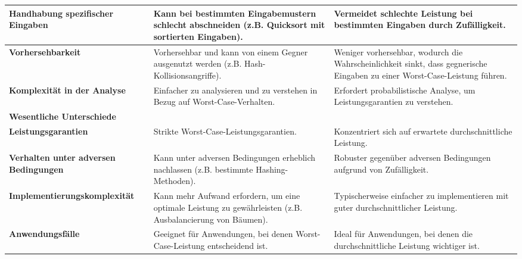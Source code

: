 \documentclass[
../../AuD-Zusammenfassung.tex,
]
{subfiles}
\begin{document}
\begin{longtable}{| p{4cm} | p{6cm} | p{6cm} |}
    \hline
    \textbf{Handhabung spezifischer Eingaben} & Kann bei bestimmten Eingabemustern schlecht abschneiden (z.B. Quicksort mit sortierten Eingaben). & Vermeidet schlechte Leistung bei bestimmten Eingaben durch Zufälligkeit. \\
    \hline
    \textbf{Vorhersehbarkeit} & Vorhersehbar und kann von einem Gegner ausgenutzt werden (z.B. Hash-Kollisionsangriffe). & Weniger vorhersehbar, wodurch die Wahrscheinlichkeit sinkt, dass gegnerische Eingaben zu einer Worst-Case-Leistung führen. \\
    \hline
    \textbf{Komplexität in der Analyse} & Einfacher zu analysieren und zu verstehen in Bezug auf Worst-Case-Verhalten. & Erfordert probabilistische Analyse, um Leistungsgarantien zu verstehen. \\
    \hline
    \rowcolor{orange!30}\textbf{Wesentliche Unterschiede} & & \\
    \hline
    \textbf{Leistungsgarantien} & Strikte Worst-Case-Leistungsgarantien. & Konzentriert sich auf erwartete durchschnittliche Leistung. \\
    \hline
    \textbf{Verhalten unter adversen Bedingungen} & Kann unter adversen Bedingungen erheblich nachlassen (z.B. bestimmte Hashing-Methoden). & Robuster gegenüber adversen Bedingungen aufgrund von Zufälligkeit. \\
    \hline
    \textbf{Implementierungskomplexität} & Kann mehr Aufwand erfordern, um eine optimale Leistung zu gewährleisten (z.B. Ausbalancierung von Bäumen). & Typischerweise einfacher zu implementieren mit guter durchschnittlicher Leistung. \\
    \hline
    \textbf{Anwendungsfälle} & Geeignet für Anwendungen, bei denen Worst-Case-Leistung entscheidend ist. & Ideal für Anwendungen, bei denen die durchschnittliche Leistung wichtiger ist. \\
    \hline
\end{longtable}
\end{document}
